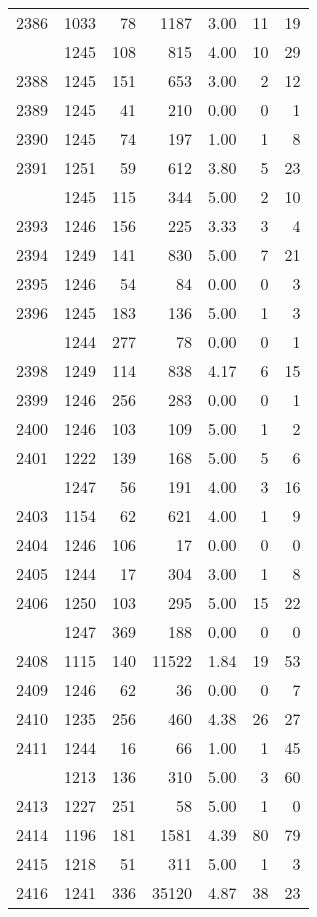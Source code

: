 \documentclass[
]{article}
\begin{document}
\begin{table}
\begin{tabular}[t]{lrrrrrr}
2386 & 1033 & 78 & 1187 & 3.00 & 11 & 19\\
\addlinespace
2387 & 1245 & 108 & 815 & 4.00 & 10 & 29\\
2388 & 1245 & 151 & 653 & 3.00 & 2 & 12\\
2389 & 1245 & 41 & 210 & 0.00 & 0 & 1\\
2390 & 1245 & 74 & 197 & 1.00 & 1 & 8\\
2391 & 1251 & 59 & 612 & 3.80 & 5 & 23\\
\addlinespace
2392 & 1245 & 115 & 344 & 5.00 & 2 & 10\\
2393 & 1246 & 156 & 225 & 3.33 & 3 & 4\\
2394 & 1249 & 141 & 830 & 5.00 & 7 & 21\\
2395 & 1246 & 54 & 84 & 0.00 & 0 & 3\\
2396 & 1245 & 183 & 136 & 5.00 & 1 & 3\\
\addlinespace
2397 & 1244 & 277 & 78 & 0.00 & 0 & 1\\
2398 & 1249 & 114 & 838 & 4.17 & 6 & 15\\
2399 & 1246 & 256 & 283 & 0.00 & 0 & 1\\
2400 & 1246 & 103 & 109 & 5.00 & 1 & 2\\
2401 & 1222 & 139 & 168 & 5.00 & 5 & 6\\
\addlinespace
2402 & 1247 & 56 & 191 & 4.00 & 3 & 16\\
2403 & 1154 & 62 & 621 & 4.00 & 1 & 9\\
2404 & 1246 & 106 & 17 & 0.00 & 0 & 0\\
2405 & 1244 & 17 & 304 & 3.00 & 1 & 8\\
2406 & 1250 & 103 & 295 & 5.00 & 15 & 22\\
\addlinespace
2407 & 1247 & 369 & 188 & 0.00 & 0 & 0\\
2408 & 1115 & 140 & 11522 & 1.84 & 19 & 53\\
2409 & 1246 & 62 & 36 & 0.00 & 0 & 7\\
2410 & 1235 & 256 & 460 & 4.38 & 26 & 27\\
2411 & 1244 & 16 & 66 & 1.00 & 1 & 45\\
\addlinespace
2412 & 1213 & 136 & 310 & 5.00 & 3 & 60\\
2413 & 1227 & 251 & 58 & 5.00 & 1 & 0\\
2414 & 1196 & 181 & 1581 & 4.39 & 80 & 79\\
2415 & 1218 & 51 & 311 & 5.00 & 1 & 3\\
2416 & 1241 & 336 & 35120 & 4.87 & 38 & 23\\

\end{tabular}
\end{table}
\end{document}
